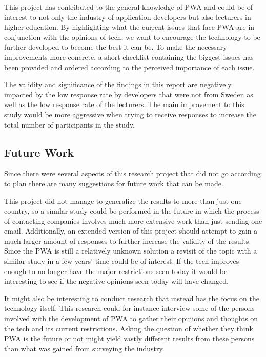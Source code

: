 \documentclass[a4paper,12pt]{article}
\begin{document}
This project has contributed to the general knowledge of PWA and could be of interest to not only the industry of application developers but also lecturers in higher education. By highlighting what the current issues that face PWA are in conjunction with the opinions of tech, we want to encourage the technology to be further developed to become the best it can be. To make the necessary improvements more concrete, a short checklist containing the biggest issues has been provided and ordered according to the perceived importance of each issue.

The validity and significance of the findings in this report are negatively impacted by the low response rate by developers that were not from Sweden as well as the low response rate of the lecturers. The main improvement to this study would be more aggressive when trying to receive responses to increase the total number of participants in the study.

\subsection{Future Work}
\label{Conclusions_futureWork}
Since there were several aspects of this research project that did not go according to plan there are many suggestions for future work that can be made.

This project did not manage to generalize the results to more than just one country, so a similar study could be performed in the future in which the process of contacting companies involves much more extensive work than just sending one email. Additionally, an extended version of this project should attempt to gain a much larger amount of responses to further increase the validity of the results. Since the PWA is still a relatively unknown solution a revisit of the topic with a similar study in a few years' time could be of interest. If the tech improves enough to no longer have the major restrictions seen today it would be interesting to see if the negative opinions seen today will have changed.

It might also be interesting to conduct research that instead has the focus on the technology itself. This research could for instance interview some of the persons involved with the development of PWA to gather their opinions and thoughts on the tech and its current restrictions. Asking the question of whether they think PWA is the future or not might yield vastly different results from these persons than what was gained from surveying the industry.
\end{document}
